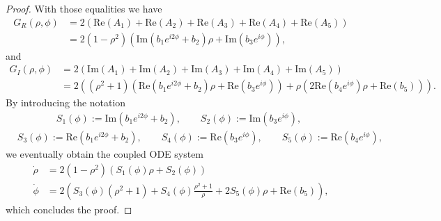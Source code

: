\documentclass[10pt,a4paper]{amsart}
\newcommand{\Dphi}{\Dot{\phi}}
\newcommand{\Drho}{\Dot{\rho}}
\newcommand{\im}[1]{\mathrm{Im} \left(#1\right)}
\newcommand{\re}[1]{\mathrm{Re}\left(#1\right)}
\begin{document}
\begin{proof}
    With those equalities we have 
    \begin{equation*}
    \begin{aligned}
    G_R(\rho, \phi) &= 2 \left( \re{A_1} + \re{A_2} + \re{A_3} + \re{A_4} + \re{A_5} \right)\\
    &= 2 (1-\rho^2)\left( \im{b_1 e^{i2\phi} + b_2} \rho  + \im{b_3 e^{i\phi}} \right),
    \end{aligned}
    \end{equation*}
    and
    \begin{equation*}
    \begin{aligned}
    G_I(\rho, \phi) &= 2 \left( \im{A_1} + \im{A_2} + \im{A_3} + \im{A_4} + \im{A_5} \right)\\
    &= 2 \left( (\rho^2 + 1) \left(  \re{b_1 e^{i2\phi} + b_2} \rho + \re{b_3 e^{i\phi}} \right) + \rho \left(2 \re{b_4 e^{i\phi}} \rho + \re{b_5} \right) \right) .
    \end{aligned}
    \end{equation*}
    By introducing the notation
    \begin{equation}
    \label{eq:func_Sj}
    \begin{aligned}
    &\qquad \qquad S_1(\phi) := \im{b_1 e^{i2\phi} + b_2}, \qquad S_2(\phi) := \im{b_3 e^{i\phi}},\\[5pt]
    &S_3(\phi) := \re{b_1 e^{i2\phi} + b_2}, \qquad S_4(\phi) := \re{b_3 e^{i\phi}}, \qquad S_5(\phi) := \re{b_4 e^{i\phi}},
    \end{aligned}
    \end{equation}
    we eventually obtain the coupled ODE system
    \begin{equation*}
    \begin{split}
        \Drho &= 2 (1-\rho^2) \left( S_1(\phi) \rho + S_2(\phi) \right)\\
        \Dphi &= 2 \left( S_3(\phi) (\rho^2+1) +  S_4(\phi) \frac{\rho^2 + 1}{\rho} + 2 S_5(\phi) \rho + \re{b_5} \right),
    \end{split}
    \end{equation*}
    which concludes the proof.
\end{proof}
\end{document}
